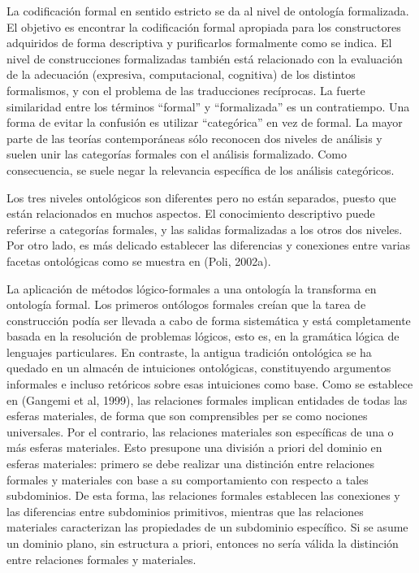 La codificación formal en sentido estricto se da al nivel de ontología formalizada. El objetivo es encontrar la codificación formal apropiada para los constructores adquiridos de forma descriptiva y purificarlos formalmente como se indica. El nivel de construcciones formalizadas también está relacionado con la evaluación de la adecuación (expresiva, computacional, cognitiva) de los distintos formalismos, y con el problema de las traducciones recíprocas. La fuerte similaridad entre los términos “formal” y “formalizada” es un contratiempo. Una forma de evitar la confusión es utilizar “categórica” en vez de formal. La mayor parte de las teorías contemporáneas sólo reconocen dos niveles de análisis y suelen unir las categorías formales con el análisis formalizado. Como consecuencia, se suele negar la relevancia específica de los análisis categóricos. 

Los tres niveles ontológicos son diferentes pero no están separados, puesto que están relacionados en muchos aspectos. El conocimiento descriptivo puede referirse a categorías formales, y las salidas formalizadas a los otros dos niveles. Por otro lado, es más delicado establecer las diferencias y conexiones entre varias facetas ontológicas como se muestra en (Poli, 2002a).        

La aplicación de métodos lógico-formales a una ontología la transforma en ontología formal. Los primeros ontólogos formales creían que la tarea de construcción podía ser llevada a cabo de forma sistemática y está completamente basada en la resolución de problemas lógicos, esto es, en la gramática lógica de lenguajes particulares. En contraste, la antigua tradición ontológica se ha quedado en un almacén de intuiciones ontológicas, constituyendo argumentos informales e incluso retóricos sobre esas intuiciones como base. Como se establece en (Gangemi et al, 1999),       las relaciones formales implican entidades de todas las esferas materiales, de forma que son comprensibles per se como nociones universales. Por el contrario, las relaciones materiales son específicas de una o más esferas materiales. Esto presupone una división a priori del dominio en esferas materiales: primero se debe realizar una distinción entre relaciones formales y materiales con base a su comportamiento con respecto a tales subdominios. De esta forma, las relaciones formales establecen las conexiones y las diferencias entre subdominios primitivos, mientras que las relaciones materiales caracterizan las propiedades de un subdominio específico. Si se asume un dominio plano, sin estructura a priori, entonces no sería válida la distinción entre relaciones formales y materiales. 

